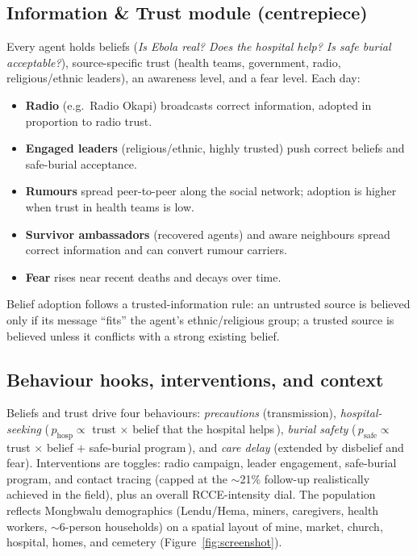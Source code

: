 \documentclass[11pt]{article}
\begin{document}
\subsection{Information \& Trust module (centrepiece)}
Every agent holds beliefs (\textit{Is Ebola real? Does the hospital help? Is safe burial acceptable?}), source-specific trust (health teams, government, radio, religious/ethnic leaders), an awareness level, and a fear level. Each day:
\begin{itemize}\itemsep2pt
  \item \textbf{Radio} (e.g.\ Radio Okapi) broadcasts correct information, adopted in proportion to radio trust.
  \item \textbf{Engaged leaders} (religious/ethnic, highly trusted) push correct beliefs and safe-burial acceptance.
  \item \textbf{Rumours} spread peer-to-peer along the social network; adoption is higher when trust in health teams is low.
  \item \textbf{Survivor ambassadors} (recovered agents) and aware neighbours spread correct information and can convert rumour carriers.
  \item \textbf{Fear} rises near recent deaths and decays over time.
\end{itemize}
Belief adoption follows a trusted-information rule: an untrusted source is believed only if its message ``fits'' the agent's ethnic/religious group; a trusted source is believed unless it conflicts with a strong existing belief.

\subsection{Behaviour hooks, interventions, and context}
Beliefs and trust drive four behaviours: \emph{precautions} (transmission), \emph{hospital-seeking} (\,$p_{\text{hosp}}\propto$ trust $\times$ belief that the hospital helps\,), \emph{burial safety} (\,$p_{\text{safe}}\propto$ trust $\times$ belief $+$ safe-burial program\,), and \emph{care delay} (extended by disbelief and fear). Interventions are toggles: radio campaign, leader engagement, safe-burial program, and contact tracing (capped at the $\sim$21\% follow-up realistically achieved in the field), plus an overall RCCE-intensity dial. The population reflects Mongbwalu demographics (Lendu/Hema, miners, caregivers, health workers, $\sim$6-person households) on a spatial layout of mine, market, church, hospital, homes, and cemetery (Figure~\ref{fig:screenshot}).
\end{document}
